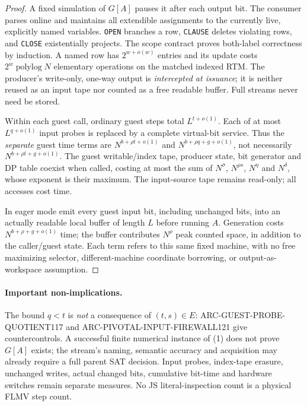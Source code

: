 \documentclass[11pt]{article}
\begin{document}
\begin{proof}
A fixed simulation of $G[A]$ pauses it after each output bit. The
consumer parses online and maintains all extendible assignments to
the currently live, explicitly named variables. \texttt{OPEN}
branches a row, \texttt{CLAUSE} deletes violating rows, and
\texttt{CLOSE} existentially projects. The scope contract proves
both-label correctness by induction. A named row has
$2^{w+o(w)}$ entries and its update costs
$2^w\operatorname{polylog}N$ elementary operations on the matched
indexed RTM. The producer's write-only, one-way output is \emph{intercepted
at issuance}; it is neither reused as an input tape nor counted as a
free readable buffer. Full streams never need be stored.

Within each guest call, ordinary guest steps total
$L^{t+o(1)}$. Each of at most $L^{q+o(1)}$ input probes is replaced by
a complete virtual-bit service. Thus the \emph{separate} guest
time terms are $N^{b+\rho t+o(1)}$ and
$N^{b+\rho q+g+o(1)}$, not necessarily
$N^{b+\rho t+g+o(1)}$. The guest writable/index tape, producer
state, bit generator and DP table coexist when called, costing at
most the sum of $N^\sigma$, $N^{\rho s}$, $N^\eta$ and $N^\delta$,
whose exponent is their maximum. The input-source tape remains
read-only; all accesses cost time.

In eager mode emit every guest input bit, including unchanged bits,
into an actually readable local buffer of length $L$ before running
$A$. Generation costs $N^{b+\rho+g+o(1)}$ time; the buffer contributes
$N^\rho$ peak counted space, in addition to the caller/guest state.
Each term refers to this same fixed machine, with no free
maximizing selector, different-machine coordinate borrowing, or
output-as-workspace assumption.
\end{proof}

\paragraph{Important non-implications.}
The bound $q<t$ is \emph{not} a consequence of $(t,s)\in E$:
ARC-GUEST-PROBE-QUOTIENT117 and ARC-PIVOTAL-INPUT-FIREWALL121
give countercontrols. A successful finite numerical instance of
(1) does not prove $G[A]$ exists; the stream's naming, semantic
accuracy and acquisition may already require a full parent SAT
decision. Input probes, index-tape erasure, unchanged writes,
actual changed bits, cumulative bit-time and hardware switches
remain separate measures. No JS literal-inspection count is a
physical FLMV step count.
\end{document}
